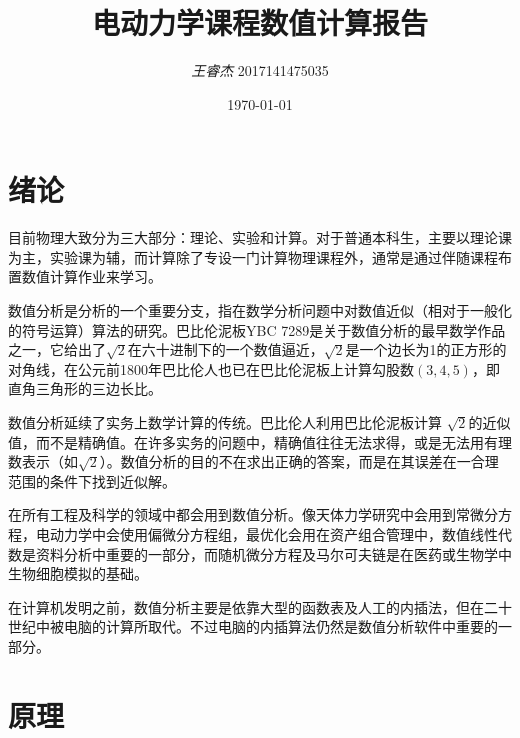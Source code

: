\documentclass[UTF8,a4paper,10pt]{ctexart}
\title{\textbf{电动力学课程数值计算报告}}
\author{\textit{王睿杰} 2017141475035}
\date{\today}
\begin{document}
\begin{multicols}{2}
    [\maketitle]
    \section{绪论}
        目前物理大致分为三大部分：理论、实验和计算。对于普通本科生，主要以理论课为主，实验课为辅，而计算除了专设一门计算物理课程外，通常是通过伴随课程布置数值计算作业来学习。\par
        数值分析是分析的一个重要分支，指在数学分析问题中对数值近似（相对于一般化的符号运算）算法的研究。巴比伦泥板YBC 7289是关于数值分析的最早数学作品之一，它给出了$\sqrt {2}$在六十进制下的一个数值逼近，$\sqrt {2}$是一个边长为1的正方形的对角线，在公元前1800年巴比伦人也已在巴比伦泥板上计算勾股数$(3,4,5)$，即直角三角形的三边长比。\par
        数值分析延续了实务上数学计算的传统。巴比伦人利用巴比伦泥板计算 $\sqrt {2}$的近似值，而不是精确值。在许多实务的问题中，精确值往往无法求得，或是无法用有理数表示（如$\sqrt {2}$）。数值分析的目的不在求出正确的答案，而是在其误差在一合理范围的条件下找到近似解。\par
        在所有工程及科学的领域中都会用到数值分析。像天体力学研究中会用到常微分方程，电动力学中会使用偏微分方程组，最优化会用在资产组合管理中，数值线性代数是资料分析中重要的一部分，而随机微分方程及马尔可夫链是在医药或生物学中生物细胞模拟的基础。\par
        在计算机发明之前，数值分析主要是依靠大型的函数表及人工的内插法，但在二十世纪中被电脑的计算所取代。不过电脑的内插算法仍然是数值分析软件中重要的一部分。\par
    \section{原理}

\end{multicols}
\end{document}
